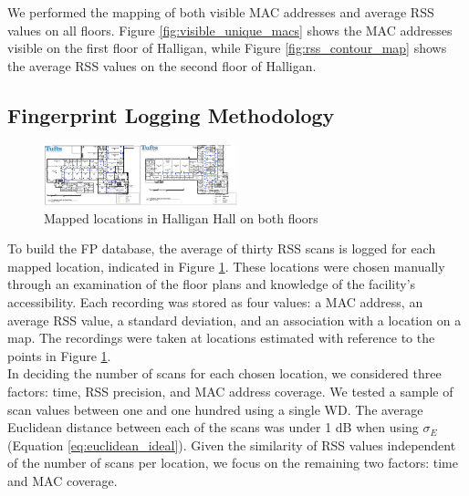 \documentclass[conference]{IEEEtran}
\begin{document}
We performed the mapping of both visible MAC addresses and average RSS values on all floors. Figure \ref{fig:visible_unique_macs} shows the MAC addresses visible on the first floor of Halligan, while Figure \ref{fig:rss_contour_map} shows the average RSS values on the second floor of Halligan.

\subsection{Fingerprint Logging Methodology}

\begin{figure}[t!] 
  \centering
    \includegraphics[width=0.5\textwidth]{floorImage.png}
     \caption{Mapped locations in Halligan Hall on both floors}
     \label{fig:mapped_positions}
\end{figure}


To build the FP database, the average of thirty RSS scans is logged for each mapped location, indicated in Figure \ref{fig:mapped_positions}. These locations were chosen manually through an examination of the floor plans and knowledge of the facility's accessibility. Each recording was stored as four values: a MAC address, an average RSS value, a standard deviation, and an association with a location on a map. The recordings were taken at locations estimated with reference to the points in Figure \ref{fig:mapped_positions}.\\
\indent In deciding the number of scans for each chosen location, we considered three factors: time, RSS precision, and MAC address coverage. We tested a sample of scan values between one and one hundred using a single WD. The average Euclidean distance between each of the scans was under 1 dB when using $\sigma_E$ (Equation \ref{eq:euclidean_ideal}). Given the similarity of RSS values independent of the number of scans per location, we focus on the remaining two factors: time and MAC coverage. \\


\begin{table}[!t]
\renewcommand{\arraystretch}{1.3}
\caption{Floor Recording Times (average 1.5 sec/scan)}
\label{tab:table_floor_times}
\centering
{}
\end{table}
\end{document}
